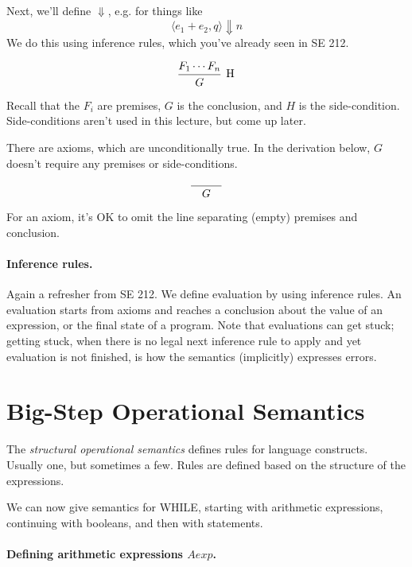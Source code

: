 \documentclass[11pt]{article}
\begin{document}
Next, we'll define $\Downarrow$, e.g. for things like
\[ \langle e_1 + e_2, q \rangle \Downarrow n \]
We do this using inference rules, which you've already seen in SE 212.

\[
  \begin{prooftree}
    \hypo{F_1 \cdots F_n}
  \infer1[H]{G}
  \end{prooftree}
\]

Recall that the $F_i$ are premises, $G$ is the conclusion, and $H$ is the side-condition. Side-conditions aren't used in this lecture, but come up later.

There are axioms, which are unconditionally true. In the derivation below, $G$ doesn't require any premises or side-conditions.

\[
  \begin{prooftree}
  \infer0{~~~G~~~}
  \end{prooftree}
  \]

  For an axiom, it's OK to omit the line separating (empty) premises and conclusion.

\paragraph{Inference rules.} Again a refresher from SE 212. We define evaluation by using inference rules. An evaluation starts from axioms and reaches a conclusion about the value of an expression, or the final state of a program. Note that evaluations can get stuck; getting stuck, when there is no legal next inference rule to apply and yet evaluation is not finished, is how the semantics (implicitly) expresses errors.

\section*{Big-Step Operational Semantics}
The \emph{structural operational semantics} defines rules for language constructs. Usually one, but sometimes a few. Rules are defined based on the structure of the expressions.

We can now give semantics for WHILE, starting with arithmetic expressions, continuing with booleans, and then with statements.

\paragraph{Defining arithmetic expressions $\mathit{Aexp}$.} 
\end{document}
